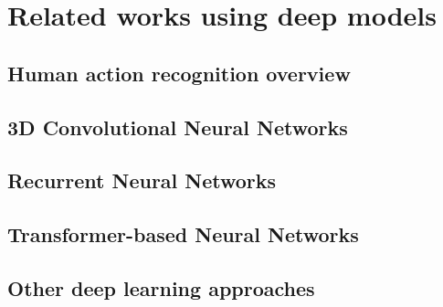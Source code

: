 \section{Related works using deep models}
\label{sec:Related works using deep models}
\subsection{Human action recognition overview}
\citet{wu2017recent}

\citet{chen2020monocular}

\subsection{3D Convolutional Neural Networks}
\citet{baccouche2011sequential}

\citet{ji20123d}

\subsection{Recurrent Neural Networks}
\citet{yue2015beyond}

\citet{donahue2015long}

\citet{jaouedi2020new}

\subsection{Transformer-based Neural Networks}
\citet{girdhar2019video}

\citet{sun2019learning}

\citet{neimark2021video}

\subsection{Other deep learning approaches}
\citet{sargano2017human}

\citet{chen2010deep}

\citet{le2011learning}